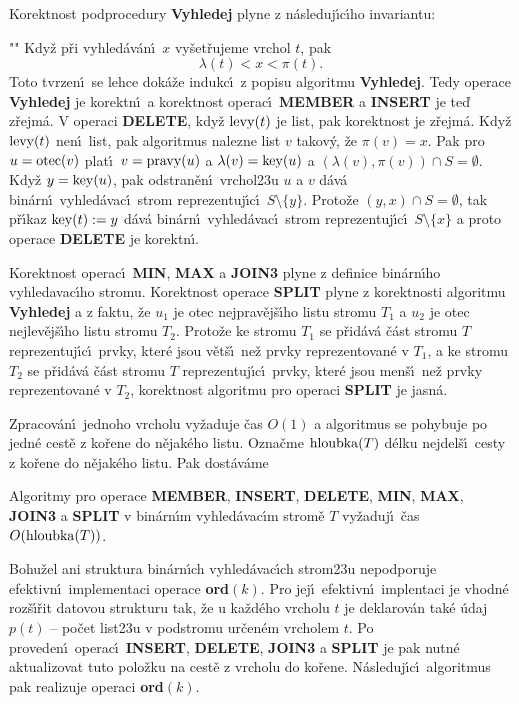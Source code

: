 \flushpar Korektnost podprocedury {\bf Vyhledej} plyne z 
n\'asleduj\'\i c\'\i ho invariantu:
\roster
\item"{}"
Kdy\v z p\v ri vyhled\'av\'an\'\i\ $x$ vy\v set\v rujeme vrchol $
t$, pak 
$$\lambda (t)<x<\pi (t).$$
\endroster
Toto tvrzen\'\i\ se lehce dok\'a\v ze indukc\'\i\ z popisu algoritmu 
{\bf Vy\-hledej}.  Tedy operace {\bf Vy\-hledej} je korektn\'\i\ a korekt\-nost 
ope\-rac\'\i\ {\bf MEMBER} a {\bf INSERT} je te\v d z\v rejm\'a. V operaci {\bf DELE\-TE},  
kdy\v z $\operatorname{levy}(t)$ je list, pak korektnost je z\v rejm\'a. Kdy\v z $\operatorname{levy}
(t)$ 
nen\'\i\ list, pak algoritmus nalezne list $v$ takov\'y, \v ze $\pi(v)=x$. 
Pak pro $u=\operatorname{otec}(v)$ plat\'\i\ $v=\operatorname{pravy}(u)$ a $\lambda(v)=\operatorname{key}(u)$ a 
$(\lambda(v),\pi(v))\cap S=\emptyset$. Kdy\v z $y=\operatorname{key}(u)$, pak 
odstran\v en\'\i\ vrchol\accent23u $u$ a $v$ d\'av\'a bin\'arn\'\i\ vyhled\'avac\'\i\ strom reprezentuj\'\i c\'\i\ $S\setminus \{y\}$. 
Proto\v ze $(y,x)\cap S=\emptyset$, tak p\v r\'\i kaz $\operatorname{key}(t):=y$ d\'av\'a bin\'arn\'\i\ 
vyhled\'avac\'\i\ strom reprezentuj\'\i c\'\i\ $S\setminus \{x\}$ a proto operace 
{\bf DELETE} je korektn\'\i . 
\medskip

\flushpar Korektnost operac\'\i\ {\bf MIN}, {\bf MAX} a {\bf JOIN3} plyne z definice 
bin\'arn\'\i ho vyhledavac\'\i ho stromu.  Korektnost operace {\bf SPLIT }
plyne z korektnosti algoritmu {\bf Vyhledej} a z faktu, \v ze $u_
1$ je otec 
nej\-prav\v ej\v s\'\i ho listu stromu $T_1$ a $u_2$ je otec nejlev\v ej\v s\'\i ho listu stromu $T_2$.  
Proto\v ze ke stromu $T_1$ se p\v rid\'av\'a \v c\'ast stromu $T$ reprezentuj\'\i c\'\i\ 
prvky, kter\'e jsou v\v et\v s\'\i\ ne\v z prvky reprezentovan\'e v $
T_1$, a ke 
stromu $T_2$ se p\v rid\'av\'a \v c\'ast stromu $T$ reprezentuj\'\i c\'\i\ prvky, 
kter\'e jsou men\v s\'\i\ ne\v z prvky reprezentovan\'e v $T_2$, korektnost 
algoritmu pro operaci {\bf SPLIT} je jasn\'a.  
\medskip

\flushpar Zpracov\'an\'\i\ jednoho vrcholu vy\v zaduje \v cas $O(
1)$ a 
algoritmus se pohybuje po jedn\'e cest\v e z ko\v rene do 
n\v ejak\'eho listu. Ozna\v cme $\operatorname{hloubka}(T)$ d\'elku nejdel\v s\'\i\ cesty 
z ko\v rene do n\v ejak\'eho listu. Pak dost\'av\'ame
\medskip

Algoritmy pro operace {\bf MEMBER}, {\bf INSERT}, {\bf DE\-LE\-TE}, {\bf MIN}, {\bf MAX}, 
{\bf JOIN3} a {\bf SPLIT} v bin\'ar\-n\'\i m vy\-hled\'a\-va\-c\'\i m stro\-m\v e $
T$ vy\v zaduj\'\i\ 
\v cas $O(\operatorname{hloubka}(T))$. 
\endproclaim

\flushpar Bohu\v zel ani struktura bin\'arn\'\i ch vyhled\'avac\'\i ch 
strom\accent23u nepodporuje efektivn\'\i\ implementaci operace 
{\bf ord$(k)$}. Pro jej\'\i\ efektivn\'\i\ implentaci je vhodn\'e roz\v s\'\i\v rit 
datovou strukturu tak, \v ze u ka\v zd\'eho vrcholu $t$ je deklarov\'an 
tak\'e \'udaj $p(t)$ -- po\v cet list\accent23u v podstromu ur\v cen\'em 
vrcholem $t$. Po proveden\'\i\ operac\'\i\ {\bf INSERT}, {\bf DELETE}, {\bf JOIN3} a 
{\bf SPLIT} je pak nutn\'e aktualizovat tuto polo\v zku na cest\v e z 
vrcholu do ko\v rene. N\'asleduj\'\i c\'\i\ algoritmus pak 
realizuje operaci {\bf ord}$(k)$.
\medskip

